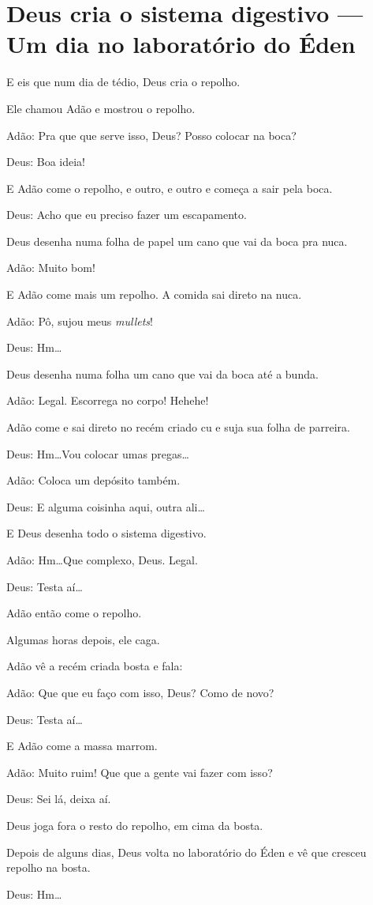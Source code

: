 \chapter{Deus cria o sistema digestivo --- Um dia no laboratório do Éden}

E eis que num dia de tédio, Deus cria o repolho.

Ele chamou Adão e mostrou o repolho.

Adão: Pra que que serve isso, Deus? Posso colocar na boca?

\enlargethispage{\baselineskip}

Deus: Boa ideia!

E Adão come o repolho, e outro, e outro e começa a sair pela boca.

Deus: Acho que eu preciso fazer um escapamento.

Deus desenha numa folha de papel um cano que vai da boca pra nuca.

Adão: Muito bom!

E Adão come mais um repolho. A comida sai direto na nuca.

Adão: Pô, sujou meus \emph{mullets}!

Deus: Hm\ldots

Deus desenha numa folha um cano que vai da boca até a bunda.

Adão: Legal. Escorrega no corpo! Hehehe!

Adão come e sai direto no recém criado cu e suja sua folha de parreira.

Deus: Hm\ldots Vou colocar umas pregas\ldots

Adão: Coloca um depósito também.

Deus: E alguma coisinha aqui, outra ali\ldots

E Deus desenha todo o sistema digestivo.

Adão: Hm\ldots Que complexo, Deus. Legal.

Deus: Testa aí\ldots

Adão então come o repolho.

Algumas horas depois, ele caga.

Adão vê a recém criada bosta e fala:

Adão: Que que eu faço com isso, Deus? Como de novo?

Deus: Testa aí\ldots

E Adão come a massa marrom.

Adão: Muito ruim! Que que a gente vai fazer com isso? 

Deus: Sei lá, deixa aí.

\enlargethispage{\baselineskip}

Deus joga fora o resto do repolho, em cima da bosta.

Depois de alguns dias, Deus volta no laboratório do Éden e vê que cresceu repolho na bosta.

Deus: Hm\ldots
